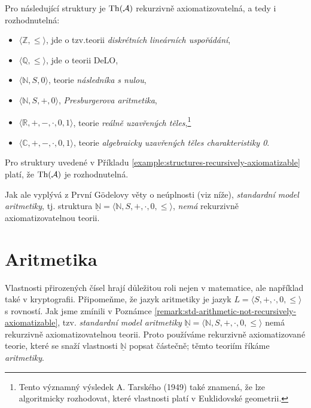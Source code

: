 \begin{example}\label{example:structures-recursively-axiomatizable}
Pro následující struktury je $\operatorname{Th}(\mathcal{A})$ rekurzivně axiomatizovatelná, a tedy i rozhodnutelná:

\begin{itemize}
    \item $\langle\mathbb Z,\leq\rangle$, jde o tzv.teorii \emph{diskrétních lineárních uspořádání},        
    \item $\langle\mathbb Q,\leq\rangle$, jde o teorii DeLO,
    \item $\langle\mathbb N,S,0\rangle$, teorie \emph{následníka s nulou},
    \item $\langle\mathbb N,S,+,0\rangle$, \emph{Presburgerova aritmetika},
    \item $\langle\mathbb R,+,-,\cdot,0,1\rangle$, teorie \emph{reálně uzavřených těles},\footnote{Tento významný výsledek A. Tarského (1949) také znamená, že lze algoritmicky rozhodovat, které vlastnosti platí v Euklidovské geometrii.}
    \item $\langle \mathbb C,+,-,\cdot,0,1 \rangle$, teorie \emph{algebraicky uzavřených těles charakteristiky 0}.
\end{itemize}
\end{example}
   
\begin{corollary}
    Pro struktury uvedené v Příkladu \ref{example:structures-recursively-axiomatizable} platí, že $\operatorname{Th}(\mathcal{A})$ je rozhodnutelná.
\end{corollary}


\begin{remark}\label{remark:std-arithmetic-not-recursively-axiomatizable}
    Jak ale vyplývá z První Gödelovy věty o neúplnosti (viz níže), \emph{standardní model aritmetiky}, tj. struktura $\underline{\mathbb N}=\langle\mathbb N,S,+,\cdot,0,\leq\rangle$, \emph{nemá} rekurzivně axiomatizovatelnou teorii.
\end{remark}


\section{Aritmetika}

Vlastnosti přirozených čísel hrají důležitou roli nejen v matematice, ale například také v kryptografii. Připomeňme, že jazyk aritmetiky je jazyk $L=\langle S,+,\cdot,0,\leq\rangle$ s rovností. Jak jsme zmínili v Poznámce \ref{remark:std-arithmetic-not-recursively-axiomatizable}, tzv. \emph{standardní model aritmetiky} $\underline{\mathbb N}=\langle\mathbb N,S,+,\cdot,0,\leq\rangle$ nemá rekurzivně axiomatizovatelnou teorii. Proto používáme rekurzivně axiomatizované teorie, které se snaží vlastnosti $\underline{\mathbb N}$ popsat částečně; těmto teoriím říkáme \emph{aritmetiky}.

